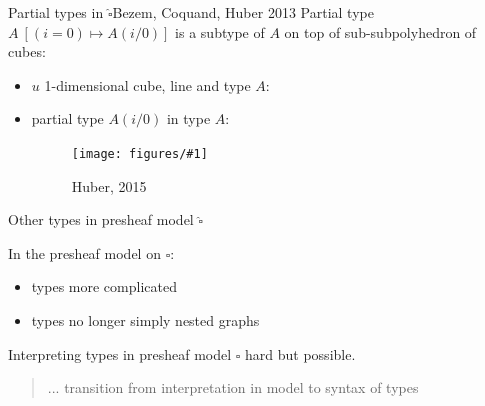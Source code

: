 \documentclass[english]{beamer}
\newcommand{\fig}[2]{
    \begin{figure}\begin{center}\texttt{[image: figures/\#1]}\caption{#2\label{#1}}\end{center}
    \end{figure}}
\begin{document}
\begin{frame}{Partial types in $\widehat{\square}$}{Bezem, Coquand, Huber 2013}
 Partial type $A\ [(i = 0) \mapsto A(i/0)]$ is a subtype of $A$ on top of sub-subpolyhedron of cubes:
 
\begin{itemize}
    \item $u$ 1-dimensional cube, line and type $A$:
    \item partial type $A(i/0)$ in type $A$:
            \fig{types_side}{Huber, 2015}
\end{itemize}

 
 
\end{frame}

\begin{frame}{Other types in presheaf model $\widehat{\square}$}

In the presheaf model on $\square$:
\begin{itemize}
    \item types more complicated
    \item types no longer simply nested graphs
\end{itemize}


Interpreting types in presheaf model $\square$ hard but possible.


\begin{quotation}
 ... transition from interpretation in model to syntax of types
\end{quotation}


\end{frame}
\end{document}
